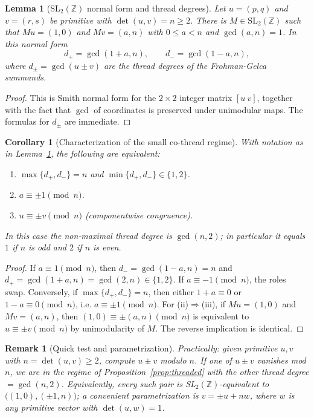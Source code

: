 \documentclass[12pt]{article}
\newtheorem{lemma}[theorem]{Lemma}
\newtheorem{corollary}[theorem]{Corollary}
\newtheorem{remark}[theorem]{Remark}
\begin{document}

\begin{lemma}[SL$_2(\mathbb Z)$ normal form and thread degrees]\label{lem:NF}
Let $u=(p,q)$ and $v=(r,s)$ be primitive with $\det(u,v)=n\ge2$. There is $M\in\mathrm{SL}_2(\mathbb Z)$
such that $M u=(1,0)$ and $M v=(a,n)$ with $0\le a<n$ and $\gcd(a,n)=1$. In this normal form
\[
d_+=\gcd(1+a,n),\qquad d_-=\gcd(1-a,n),
\]
where $d_\pm=\gcd(u\pm v)$ are the thread degrees of the Frohman-Gelca summands.
\end{lemma}

\begin{proof}
This is Smith normal form for the $2\times2$ integer matrix $[u\ v]$, together with the fact that
$\gcd$ of coordinates is preserved under unimodular maps. The formulas for $d_\pm$ are immediate.
\end{proof}


\begin{corollary}[Characterization of the small co-thread regime]\label{cor:small}
With notation as in Lemma~\ref{lem:NF}, the following are equivalent:
\begin{enumerate}
\item $\max\{d_+,d_-\}=n$ and $\min\{d_+,d_-\}\in\{1,2\}$.
\item $a\equiv \pm 1 \pmod n$.
\item $u\equiv \pm v \pmod n$ (componentwise congruence).
\end{enumerate}
In this case the non‑maximal thread degree is $\gcd(n,2)$; in particular it equals $1$ if $n$ is odd and $2$ if $n$ is even.
\end{corollary}

\begin{proof}
If $a\equiv1\pmod n$, then $d_-=\gcd(1-a,n)=n$ and $d_+=\gcd(1+a,n)=\gcd(2,n)\in\{1,2\}$. If
$a\equiv-1\pmod n$, the roles swap. Conversely, if $\max\{d_+,d_-\}=n$, then either $1+a\equiv0$ or
$1-a\equiv0\pmod n$, i.e. $a\equiv\pm1\pmod n$. For (ii)\(\Rightarrow\)(iii), if $Mu=(1,0)$ and $Mv=(a,n)$, then $(1,0)\equiv\pm(a,n)\pmod n$ is equivalent to $u\equiv\pm v\pmod n$ by unimodularity of $M$. The reverse implication is identical.
\end{proof}


\begin{remark}[Quick test and parametrization]
Practically: given primitive $u,v$ with $n = \det(u,v) \geq 2$, compute $u\pm v$ modulo $n$. If one of
$u\pm v$ vanishes mod $n$, we are in the regime of Proposition~\ref{prop:threaded}
with the other thread degree $=\gcd(n,2)$. Equivalently, every such pair is SL$_2(\mathbb Z)$-equivalent to
$\big((1,0),(\pm1,n)\big)$; a convenient parametrization is $v=\pm u + n w$, where $w$ is any primitive vector with $\det(u,w)=1$.
\end{remark}
\end{document}
